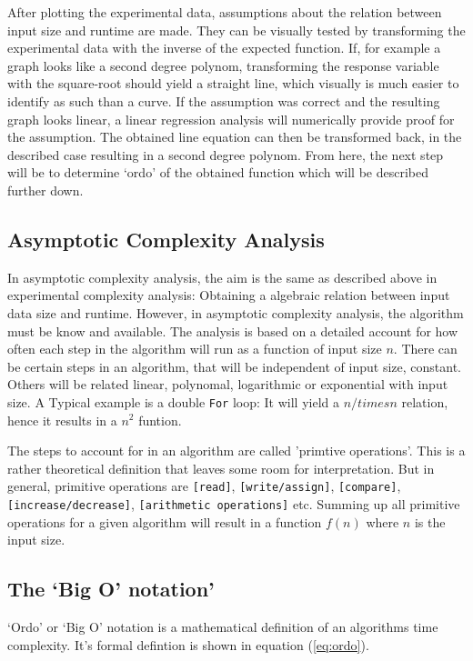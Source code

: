 \documentclass[a4paper,11pt,twoside]{article}
\begin{document}
After plotting the experimental data, assumptions about the relation
between input size and runtime are made. They can be visually tested
by transforming the experimental data with the inverse of the expected
function. If, for example a graph looks like a second degree polynom,
transforming the response variable with the square-root should yield a
straight line, which visually is much easier to identify as such than
a curve. If the assumption was correct and the resulting graph looks
linear, a linear regression analysis will numerically provide proof
for the assumption. The obtained line equation can then be
transformed back, in the described case resulting in a second degree 
polynom. From here, the next step will be to determine `ordo' of the
obtained function which will be described further down.

\subsection{Asymptotic Complexity Analysis}
In asymptotic complexity analysis, the aim is the same as described
above in experimental complexity analysis: Obtaining a algebraic
relation between input data size and runtime. However, in asymptotic
complexity analysis, the algorithm must be know and available. The
analysis is based on a detailed account for how often each step in the
algorithm will run as a function of input size $n$. There can be
certain steps in an algorithm, that will be independent of input
size, constant. Others will be related linear, polynomal, logarithmic
or exponential with input size. A Typical example is a double
\verb!For! loop: It will yield a $n /times n$ relation, hence it
results in a $n^2$ funtion.

The steps to account for in an algorithm are called 'primtive
operations'. This is a rather theoretical definition that leaves some
room for interpretation. But in general, primitive operations are
\verb![read]!, \verb![write/assign]!, \verb![compare]!,
\verb![increase/decrease]!, \verb![arithmetic operations]! etc. Summing up
all primitive operations for a given algorithm will result in a
function $f(n)$ where $n$ is the input size.

\subsection{The `Big O' notation'}
`Ordo' or `Big O' notation is a mathematical definition of an algorithms
time complexity. It's formal defintion is shown in equation
(\ref{eq:ordo})\cite[pp. 245]{janlert2000}.  
\end{document}
